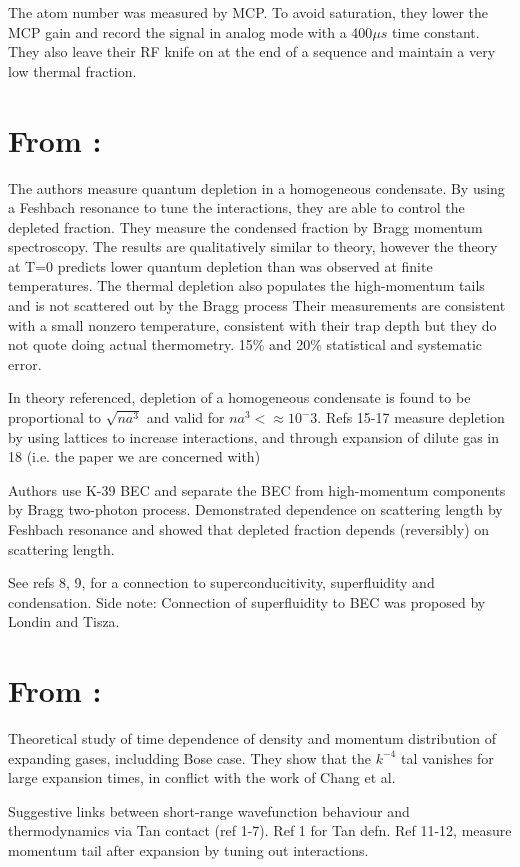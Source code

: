 \documentclass{article}
\begin{document}
The atom number was measured by MCP. To avoid saturation, they lower the MCP gain and record the signal in analog mode with a 400$\mu s$ time constant. They also leave their RF knife on at the end of a sequence and maintain a very low thermal fraction. 

\section{From \cite{Lopes}:}
The authors measure quantum depletion in a homogeneous condensate. By using a Feshbach resonance to tune the interactions, they are able to control the depleted fraction. They measure the condensed fraction by Bragg momentum spectroscopy. The results are qualitatively similar to theory, however the theory at T=0 predicts lower quantum depletion than was observed at finite temperatures. The thermal depletion also populates the high-momentum tails and is not scattered out by the Bragg process Their measurements are consistent with a small nonzero temperature, consistent with their trap depth but they do not quote doing actual thermometry. 15\% and 20\% statistical and systematic error. 

In theory referenced, depletion of a homogeneous condensate is found to be proportional to $\sqrt{na^3}$ and valid for $na^3<\approx 10^-3$. Refs 15-17 measure depletion by using lattices to increase interactions, and through expansion of dilute gas in 18 (i.e. the paper we are concerned with)

Authors use K-39 BEC and separate the BEC from high-momentum components by Bragg two-photon process. Demonstrated dependence on scattering length by Feshbach resonance and showed that depleted fraction depends (reversibly) on scattering length.

See refs 8, 9, for a connection to superconducitivity, superfluidity and condensation.
Side note: Connection of superfluidity to BEC was proposed by Londin and Tisza. 


\section{From \cite{Qu}:}
Theoretical study of time dependence of density and momentum distribution of expanding gases, includding Bose case. They show that the $k^{-4}$ tal vanishes for large expansion times, in conflict with the work of Chang et al.

Suggestive links between short-range wavefunction behaviour and thermodynamics via Tan contact (ref 1-7). Ref 1 for Tan defn. Ref 11-12, measure momentum tail after expansion by tuning out interactions. 
\end{document}
